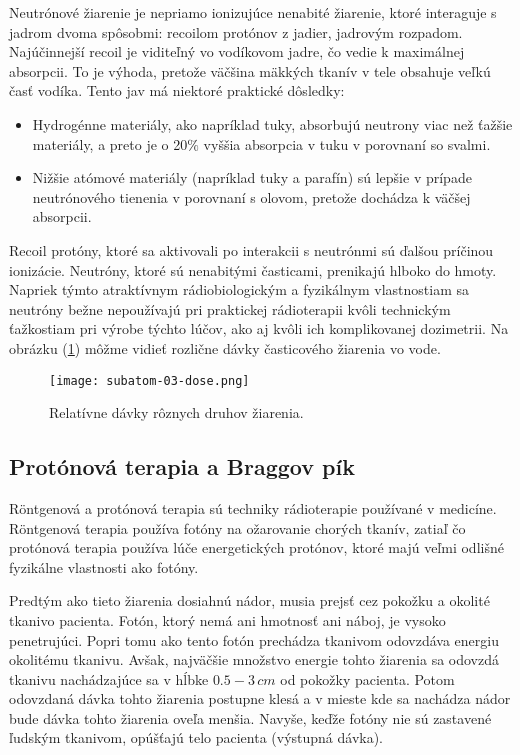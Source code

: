 \documentclass[../../main.tex]{subfiles}
\begin{document}
Neutrónové žiarenie je nepriamo ionizujúce nenabité žiarenie, ktoré interaguje s jadrom dvoma spôsobmi: recoilom protónov z jadier, jadrovým rozpadom. Najúčinnejší recoil je viditeľný vo vodíkovom jadre, čo vedie k maximálnej absorpcii. To je výhoda, pretože väčšina mäkkých tkanív v tele obsahuje veľkú časť vodíka. Tento jav má niektoré praktické dôsledky:
\begin{itemize}
\item Hydrogénne materiály, ako napríklad tuky, absorbujú neutrony viac než ťažšie materiály, a preto je o 20$\%$ vyššia absorpcia v tuku v porovnaní so svalmi.
\item Nižšie atómové materiály (napríklad tuky a parafín) sú lepšie v prípade neutrónového tienenia v porovnaní s olovom, pretože dochádza k väčšej absorpcii.
\end{itemize}
Recoil protóny, ktoré sa aktivovali po interakcii s neutrónmi sú ďalšou príčinou ionizácie. Neutróny, ktoré sú nenabitými časticami, prenikajú hlboko do hmoty. Napriek týmto atraktívnym rádiobiologickým a fyzikálnym vlastnostiam sa neutróny bežne nepoužívajú pri praktickej rádioterapii kvôli technickým ťažkostiam pri výrobe týchto lúčov, ako aj kvôli ich komplikovanej dozimetrii. Na obrázku (\ref{sf3:fig:dose}) môžme vidieť rozlične dávky časticového žiarenia vo vode.

\begin{figure}[!h]
\texttt{[image: subatom-03-dose.png]}
\centering
\caption{Relatívne dávky rôznych druhov žiarenia.}
\label{sf3:fig:dose}
\end{figure}

\subsection{Protónová terapia a Braggov pík}
Röntgenová a protónová terapia sú techniky rádioterapie používané v medicíne. Röntgenová terapia používa fotóny na ožarovanie chorých tkanív, zatiaľ čo protónová terapia používa lúče energetických protónov, ktoré majú veľmi odlišné fyzikálne vlastnosti ako fotóny.

Predtým ako tieto žiarenia dosiahnú nádor, musia prejsť cez pokožku a okolité tkanivo pacienta. Fotón, ktorý nemá ani hmotnosť ani náboj, je vysoko penetrujúci. Popri tomu ako tento fotón prechádza tkanivom odovzdáva energiu okolitému tkanivu. Avšak, najväčšie množstvo energie tohto žiarenia sa odovzdá tkanivu nachádzajúce sa v hĺbke $0.5-3\,cm$ od pokožky pacienta. Potom odovzdaná dávka tohto žiarenia postupne klesá a v mieste kde sa nachádza nádor bude dávka tohto žiarenia oveľa menšia. Navyše, keďže fotóny nie sú zastavené ľudským tkanivom, opúšťajú telo pacienta (výstupná dávka).
\end{document}
